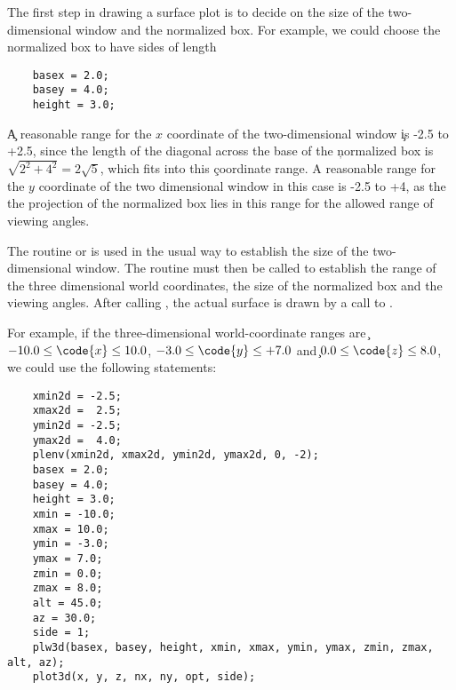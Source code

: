 The first step in drawing a surface plot is to decide on the size of the
two-dimensional window and the normalized box.  For example, we could
choose the normalized box to have sides of length

\begin{verbatim}
    basex = 2.0;
    basey = 4.0;
    height = 3.0;
\end{verbatim}

\c A reasonable range for the $x$ coordinate of the two-dimensional window
\c is -2.5 to +2.5, since the length of the diagonal across the base of the
\c normalized box is $\sqrt{2^2+4^2} = 2\sqrt{5}$, which fits into this
\c coordinate range.  A reasonable range for the $y$ coordinate of the two
dimensional window in this case is -2.5 to +4, as the the projection of
the normalized box lies in this range for the allowed range of viewing
angles.

The routine  or  is used in the usual way to
establish the size of the two-dimensional window.  The routine
 must then be called to establish the range of the three
dimensional world coordinates, the size of the normalized box and the
viewing angles.  After calling , the actual surface is drawn
by a call to .

For example, if the three-dimensional world-coordinate ranges are
\c $-10.0\le\code{x}\le 10.0$, $-3.0\le\code{y}\le +7.0$ and
\c $0.0\le\code{z}\le 8.0$, we could use the following statements:

\begin{verbatim}
    xmin2d = -2.5;
    xmax2d =  2.5;
    ymin2d = -2.5;
    ymax2d =  4.0;
    plenv(xmin2d, xmax2d, ymin2d, ymax2d, 0, -2);
    basex = 2.0;
    basey = 4.0;
    height = 3.0;
    xmin = -10.0;
    xmax = 10.0;
    ymin = -3.0;
    ymax = 7.0;
    zmin = 0.0;
    zmax = 8.0;
    alt = 45.0;
    az = 30.0;
    side = 1;
    plw3d(basex, basey, height, xmin, xmax, ymin, ymax, zmin, zmax, alt, az);
    plot3d(x, y, z, nx, ny, opt, side);
\end{verbatim}

